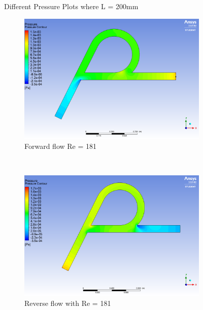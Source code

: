 \begin{figure}[H]
\caption{Different Pressure Plots where L = 200mm}
\label{fig:l200}
\end{figure}





\begin{figure}[H]
 \centering
\begin{subfigure}{.45\textwidth}
  \centering
  \includegraphics[width=.9\linewidth]{images/task2/L400/forward181.png}
  \caption{Forward flow Re = 181}
  \label{fig:x_d_norm}
\end{subfigure}%
~
\begin{subfigure}{.45\textwidth}
  \centering
  \includegraphics[width=.9\linewidth]{images/task2/L400/reverse181.png}
  \caption{Reverse flow with Re = 181}
  \label{fig:x_d_norm_actual}
\end{subfigure}
~
\begin{subfigure}{.45\textwidth}
  \centering

\end{subfigure}
\end{figure}
